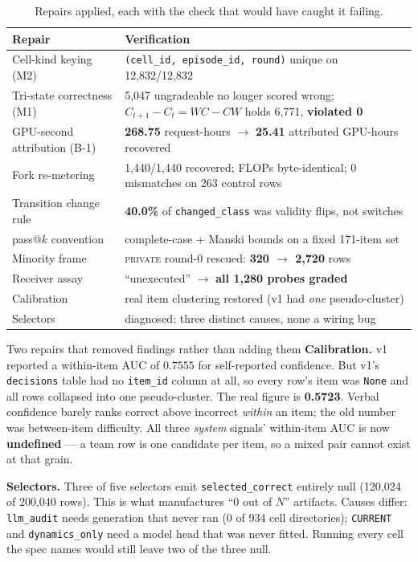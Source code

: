 \documentclass[11pt]{article}
\begin{document}
\begin{table}[H]\centering\small
\caption{Repairs applied, each with the check that would have caught it failing.}
\begin{tabular}{p{}p{}}
\toprule
\textbf{Repair} & \textbf{Verification} \\
\midrule
Cell-kind keying (M2) & \texttt{(cell\_id, episode\_id, round)} unique on 12{,}832/12{,}832 \\
Tri-state correctness (M1) & 5{,}047 ungradeable no longer scored wrong; $C_{t+1}-C_t = WC-CW$ holds 6{,}771, \textbf{violated 0} \\
GPU-second attribution (B-1) & \textbf{268.75} request-hours $\rightarrow$ \textbf{25.41} attributed GPU-hours recovered \\
Fork re-metering & 1{,}440/1{,}440 recovered; FLOPs byte-identical; 0 mismatches on 263 control rows \\
Transition change rule & \textbf{40.0\%} of \texttt{changed\_class} was validity flips, not switches \\
pass@$k$ convention & complete-case + Manski bounds on a fixed 171-item set \\
Minority frame & \textsc{private} round-0 rescued: \textbf{320 $\rightarrow$ 2{,}720} rows \\
Receiver assay & ``unexecuted'' $\rightarrow$ \textbf{all 1{,}280 probes graded} \\
Calibration & real item clustering restored (v1 had \emph{one} pseudo-cluster) \\
Selectors & diagnosed: three distinct causes, none a wiring bug \\
\bottomrule
\end{tabular}
\end{table}

\begin{caution}{Two repairs that removed findings rather than adding them}
\textbf{Calibration.} v1 reported a within-item AUC of $0.7555$ for self-reported confidence. But
v1's \texttt{decisions} table had no \texttt{item\_id} column at all, so every row's item was
\texttt{None} and all rows collapsed into one pseudo-cluster. The real figure is \textbf{0.5723}.
Verbal confidence barely ranks correct above incorrect \emph{within} an item; the old number was
between-item difficulty. All three \emph{system} signals' within-item AUC is now \textbf{undefined}
--- a team row is one candidate per item, so a mixed pair cannot exist at that grain.

\textbf{Selectors.} Three of five selectors emit \texttt{selected\_correct} entirely null
(120{,}024 of 200{,}040 rows). This is what manufactures ``0 out of $N$'' artifacts. Causes differ:
\texttt{llm\_audit} needs generation that never ran (0 of 934 cell directories);
\texttt{CURRENT} and \texttt{dynamics\_only} need a model head that was never fitted. Running every
cell the spec names would still leave two of the three null.
\end{caution}
\end{document}
